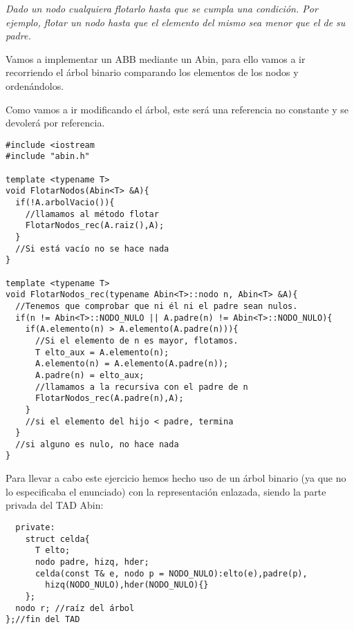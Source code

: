 \textbf{}\textit{ Dado un nodo cualquiera flotarlo hasta que se cumpla una condición. Por ejemplo, flotar un nodo hasta que el elemento del mismo sea menor que el de su padre.}

Vamos a implementar un ABB mediante un Abin, para ello vamos a ir recorriendo el árbol binario comparando los elementos de los nodos y ordenándolos.

Como vamos a ir modificando el árbol, este será una referencia no constante y se devolerá por referencia.
\begin{verbatim}
#include <iostream
#include "abin.h"

template <typename T>
void FlotarNodos(Abin<T> &A){
  if(!A.arbolVacio()){
    //llamamos al método flotar
    FlotarNodos_rec(A.raiz(),A);
  }
  //Si está vacío no se hace nada
}

template <typename T>
void FlotarNodos_rec(typename Abin<T>::nodo n, Abin<T> &A){
  //Tenemos que comprobar que ni él ni el padre sean nulos.
  if(n != Abin<T>::NODO_NULO || A.padre(n) != Abin<T>::NODO_NULO){
    if(A.elemento(n) > A.elemento(A.padre(n))){
      //Si el elemento de n es mayor, flotamos.
      T elto_aux = A.elemento(n);
      A.elemento(n) = A.elemento(A.padre(n));
      A.padre(n) = elto_aux;
      //llamamos a la recursiva con el padre de n
      FlotarNodos_rec(A.padre(n),A);
    }
    //si el elemento del hijo < padre, termina
  }
  //si alguno es nulo, no hace nada
}
\end{verbatim}

Para llevar a cabo este ejercicio hemos hecho uso de un árbol binario (ya que no lo especificaba el enunciado) con la representación enlazada, siendo la parte privada del TAD Abin:
\begin{center}
  \begin{verbatim}
  private:
    struct celda{
      T elto;
      nodo padre, hizq, hder;
      celda(const T& e, nodo p = NODO_NULO):elto(e),padre(p),
        hizq(NODO_NULO),hder(NODO_NULO){}
    };
  nodo r; //raíz del árbol
};//fin del TAD
  \end{verbatim}
\end{center}

